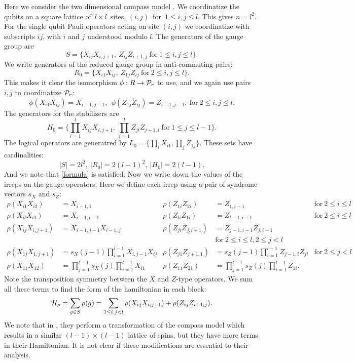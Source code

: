 \documentclass[12pt,notitlepage,longbibliography,nofootinbib,tightenlines]{revtex4}
\begin{document}
Here we consider the two dimensional compass model \cite{Bacon2006}.
We coordinatize the qubits on a square 
lattice of\ $l\times l$\ sites,
$(i, j)$\ for\ $1\le i, j\le l.$
This gives $n = l^2.$
For the single qubit Pauli operators acting on site
$(i, j)$ we coordinatize with subscripts $ij$, 
with $i$ and $j$ understood modulo $l$.
The generators of the gauge group are
$$
    S = \big\{ X_{ij}X_{i,j+1},\ Z_{ij}Z_{i+1,j}\ \mbox{for}\ 1\le i, j\le l\big\}.
$$
We write generators of the reduced
gauge group in anti-commuting pairs:
$$
    R_0 = \big\{ X_{i1}X_{ij},\ Z_{1j}Z_{ij}\ \mbox{for}\ 2\le i, j\le l\big\}.
$$
This makes it clear the isomorphism $\phi : R \to \mathcal{P}_r$ to use,
and we again use pairs $i,j$ to coordinatize $\mathcal{P}_r$:
$$
    \phi(X_{i1}X_{ij}) = X_{i-1,j-1}, \ \ \phi(Z_{1j}Z_{ij}) = Z_{i-1,j-1},\ \mbox{for}\ 2\le i, j\le l.
$$
The generators for the stabilizers are
$$
    H_0 = \big\{ \prod_{i=1}^l X_{ij}X_{i,j+1},\ \prod_{i=1}^l Z_{ji}Z_{j+1,i}\ \mbox{for}\ 1\le j\le l-1\big\}.
$$
The logical operators are generatred by $L_0 = \big\{ \prod_i X_{i1}, \prod_j Z_{1j} \}.$
These sets have cardinalities:
$$|S|=2l^2,\ |R_0| = 2(l-1)^2,\ |H_0| = 2(l-1).$$
And we note that \ref{formula} is satisfied.
Now we write down the values of the
irreps on the gauge operators.
Here we define each irrep using a pair 
of syndrome vectors $s_X$ and $s_Z:$
\begin{align*}
\rho(X_{i1} X_{i2}) &= X_{i-1,1} &
\rho(Z_{1i} Z_{2i}) &= Z_{1,i-1} &\mbox{for}\ 2\le i\le l\\
\rho(X_{il} X_{i1}) &= X_{i-1,l-1} &
\rho(Z_{li} Z_{1i}) &= Z_{l-1,i-1} &\mbox{for}\ 2\le i\le l\\
\rho(X_{ij} X_{i,j+1}) &= X_{i-1,j-1} X_{i-1,j} &
\rho(Z_{ji} Z_{j,i+1}) &= Z_{j-1,i-1}Z_{j,i-1} \\&&&\mbox{for}\ 2\le i\le l, 2\le j<l\\
\rho(X_{1j} X_{1,j+1}) &= s_X(j-1) \prod_{i=1}^{l-1} X_{i,j-1} X_{ij} &
\rho(Z_{j1} Z_{j+1,1}) &= s_Z(j-1) \prod_{i=1}^{l-1} Z_{j-1,i} Z_{ji} &\mbox{for}\ 2\le j<l\\
\rho(X_{11} X_{12}) &= \prod_{j=1}^{l-1}s_X(j) \prod_{i=1}^{l-1} X_{i1} &
\rho(Z_{11} Z_{21}) &= \prod_{j=1}^{l-1}s_Z(j) \prod_{i=1}^{l-1} Z_{1i}.
\end{align*}
Note the transposition symmetry between the $X$ and $Z$-type operators.
We sum all these terms to find 
the form of the hamiltonian in each block:
$$
\mathcal{H}_\rho = \sum_{g\in S} \rho(g) = \sum_{1\le i,j<l} \rho(X_{ij}X_{i,j+1}) + \rho(Z_{ij}Z_{i+1,j}).
$$
We note that in \cite{Brzezicki2013}, they perform a
transformation of the compass model
which results in a similar $(l-1)\times(l-1)$ lattice
of spins, but they have more terms in their Hamiltonian.
It is not clear if these modifications are essential to
their analysis.
\end{document}

